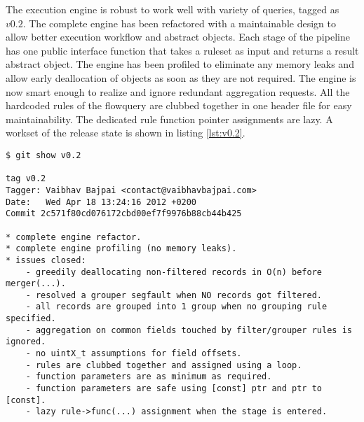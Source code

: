 The execution engine is robust to work well with variety of queries, tagged as
$v0.2$. The complete engine has been refactored with a maintainable design to
allow better execution workflow and abstract objects. Each stage of the
pipeline has one public interface function that takes a ruleset as input and
returns a result abstract object. The engine has  been
profiled to eliminate any memory leaks and allow early deallocation of objects
as soon as they are not required. The engine is now smart enough to realize
and ignore redundant aggregation requests. All the hardcoded rules of the
flowquery are clubbed together in one header file for easy maintainability.
The dedicated rule function pointer assignments are lazy. A workset of the
release state is shown in listing \ref{lst:v0.2}.

\begin{lstlisting}
$ git show v0.2

tag v0.2
Tagger: Vaibhav Bajpai <contact@vaibhavbajpai.com>
Date:   Wed Apr 18 13:24:16 2012 +0200
Commit 2c571f80cd076172cbd00ef7f9976b88cb44b425

* complete engine refactor.
* complete engine profiling (no memory leaks).
* issues closed:
    - greedily deallocating non-filtered records in O(n) before merger(...).
    - resolved a grouper segfault when NO records got filtered.
    - all records are grouped into 1 group when no grouping rule specified.
    - aggregation on common fields touched by filter/grouper rules is ignored.
    - no uintX_t assumptions for field offsets.
    - rules are clubbed together and assigned using a loop.
    - function parameters are as minimum as required.
    - function parameters are safe using [const] ptr and ptr to [const].
    - lazy rule->func(...) assignment when the stage is entered.
\end{lstlisting}

